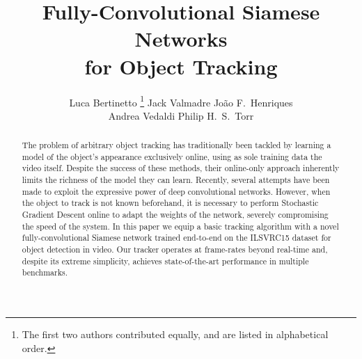 \documentclass[runningheads]{llncs}
\begin{document}
\pagestyle{headings}
\mainmatter

\newcommand{\jack}[1]{{\color{blue} [Jack: #1]}}
\newcommand{\luca}[1]{{\color{orange} [Luca: #1]}}
\newcommand{\joao}[1]{{\color{green!50!black} [Joao: #1]}}
\newcommand{\todo}[1]{{\color{red} [TODO: #1]}}
\newcommand{\tocite}[1]{{\color{purple} [cite: #1]}}

\newcommand{\eg}{e.g.\xspace}
\newcommand{\ie}{i.e.\xspace}

\newcommand{\R}{\mathbb{R}}

\renewcommand{\paragraph}[1]{\par\noindent\textbf{#1}}
 \title{Fully-Convolutional Siamese Networks \\ for Object Tracking}



\author{
Luca Bertinetto
\thanks{The first two authors contributed equally, and are listed in alphabetical order.}
\quad Jack Valmadre 
\quad Jo\~{a}o F.\ Henriques \\
\quad Andrea Vedaldi
\quad Philip H.\ S.\ Torr \\
}



\maketitle

\begin{abstract}
The problem of arbitrary object tracking has traditionally been tackled by learning a model of the object's appearance exclusively online, using as sole training data the video itself.
Despite the success of these methods, their online-only approach inherently limits the richness of the model they can learn.
Recently, several attempts have been made to exploit the expressive power of deep convolutional networks.
However, when the object to track is not known beforehand, it is necessary to perform Stochastic Gradient Descent online to adapt the weights of the network, severely compromising the speed of the system.
In this paper we equip a basic tracking algorithm with a novel fully-convolutional Siamese network trained end-to-end on the ILSVRC15 dataset for object detection in video.
Our tracker operates at frame-rates beyond real-time and, despite its extreme simplicity, achieves state-of-the-art performance in multiple benchmarks.
\end{abstract}
\end{document}
